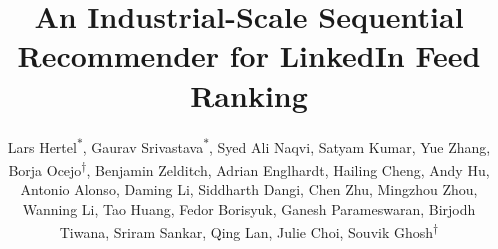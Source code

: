 \documentclass[sigconf]{acmart}
\newcommand{\systemname}{\textit{Feed SR}}
\begin{document}
\title{An Industrial-Scale Sequential Recommender for LinkedIn Feed Ranking}












\author{Lars Hertel\textsuperscript{$\ast$}, Gaurav Srivastava\textsuperscript{$\ast$},
Syed Ali Naqvi, Satyam Kumar, Yue Zhang, Borja Ocejo\textsuperscript{$\dagger$}, Benjamin Zelditch,
Adrian Englhardt, Hailing Cheng, Andy Hu, Antonio Alonso, Daming Li, Siddharth Dangi,
Chen Zhu, Mingzhou Zhou, Wanning Li, Tao Huang, Fedor Borisyuk, Ganesh Parameswaran,
Birjodh Tiwana, Sriram Sankar, Qing Lan, Julie Choi, Souvik Ghosh\textsuperscript{$\dagger$}}
\end{document}
